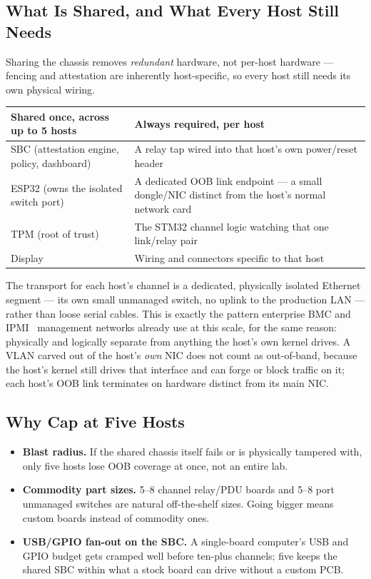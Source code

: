 \documentclass[11pt,a4paper]{article}
\begin{document}
\subsection{What Is Shared, and What Every Host Still Needs}

Sharing the chassis removes \emph{redundant} hardware, not per-host
hardware --- fencing and attestation are inherently host-specific, so
every host still needs its own physical wiring.

\begin{center}
\renewcommand{\arraystretch}{1.35}
\begin{tabular}{@{}p{5.4cm}p{8.2cm}@{}}
\toprule
\textbf{Shared once, across up to 5 hosts} & \textbf{Always required, per host} \\
\midrule
SBC (attestation engine, policy, dashboard) & A relay tap wired into that host's own power/reset header \\
ESP32 (owns the isolated switch port) & A dedicated OOB link endpoint --- a small dongle/NIC distinct from the host's normal network card \\
TPM (root of trust) & The STM32 channel logic watching that one link/relay pair \\
Display & Wiring and connectors specific to that host \\
\bottomrule
\end{tabular}
\end{center}

The transport for each host's channel is a dedicated, physically
isolated Ethernet segment --- its own small unmanaged switch, no uplink
to the production LAN --- rather than loose serial cables. This is
exactly the pattern enterprise BMC and IPMI~\cite{dmtfipmi} management networks already
use at this scale, for the same reason: physically and logically
separate from anything the host's own kernel drives. A VLAN carved out
of the host's \emph{own} NIC does not count as out-of-band, because the
host's kernel still drives that interface and can forge or block
traffic on it; each host's OOB link terminates on hardware distinct
from its main NIC.

\subsection{Why Cap at Five Hosts}

\begin{itemize}
  \item \textbf{Blast radius.} If the shared chassis itself fails or is
    physically tampered with, only five hosts lose OOB coverage at
    once, not an entire lab.
  \item \textbf{Commodity part sizes.} 5--8 channel relay/PDU boards
    and 5--8 port unmanaged switches are natural off-the-shelf sizes.
    Going bigger means custom boards instead of commodity ones.
  \item \textbf{USB/GPIO fan-out on the SBC.} A single-board computer's
    USB and GPIO budget gets cramped well before ten-plus channels; five
    keeps the shared SBC within what a stock board can drive without a
    custom PCB.
\end{itemize}
\end{document}
